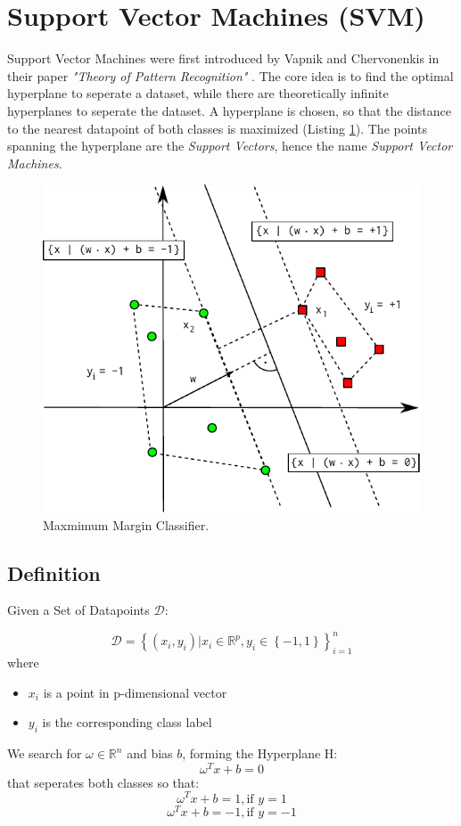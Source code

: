 \section{Support Vector Machines (SVM)}
Support Vector Machines were first introduced by Vapnik and Chervonenkis in their paper \textit{"Theory of Pattern Recognition"} \cite{VC74}. The core idea is to find the optimal hyperplane to seperate a dataset, while there are theoretically infinite hyperplanes to seperate the dataset. A hyperplane is chosen, so that the distance to the nearest datapoint of both classes is maximized (Listing \ref{fig:maximum_margin}). The points spanning the hyperplane are the \textit{Support Vectors}, hence the name \textit{Support Vector Machines}.\cite{VC95}

\begin{figure}
\begin{center}
\includegraphics[scale=0.7]{img/svm/margin.pdf}
\end{center}
 \caption{Maxmimum Margin Classifier.}
 \label{fig:maximum_margin}
\end{figure}

\subsection{Definition}
Given a Set of Datapoints $\mathcal{D}$:

$$\mathcal{D} = \left\{(x_i, y_i) | x_i \in \mathbb{R}^p, y_i \in \left\{-1,1\right\}\right\}_{i=1}^n$$
where
\begin{itemize}
 \item $x_i$ is a point in p-dimensional vector
 \item $y_i$ is the corresponding class label
\end{itemize}
We search for $\omega \in \mathbb{R}^n$ and bias $b$, forming the Hyperplane H:
$$\omega^T x + b = 0$$
that seperates both classes so that:
$$ \omega^T x + b = 1,\mbox{if } y = 1 $$
$$ \omega^T x + b = -1, \mbox{if } y = -1 $$

